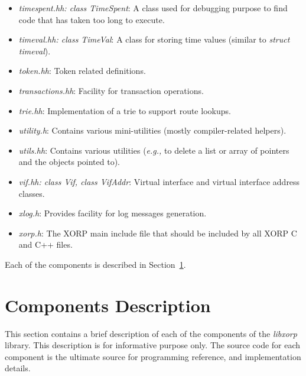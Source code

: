 \documentclass[11pt]{article}
\newcommand{\eg}{\emph{e.g.,}\xspace}
\begin{document}
\begin{itemize}
  \item \emph{timespent.hh: class TimeSpent}: A class used for debugging
  purpose to find code that has taken too long to execute.

  \item \emph{timeval.hh: class TimeVal}: A class for storing time values
  (similar to \emph{struct timeval}).

  \item \emph{token.hh}: Token related definitions.

  \item \emph{transactions.hh}: Facility for transaction operations.

  \item \emph{trie.hh}: Implementation of a trie to support route
  lookups.

  \item \emph{utility.h}: Contains various mini-utilities
  (mostly compiler-related helpers).

  \item \emph{utils.hh}: Contains various utilities (\eg to delete a
  list or array of pointers and the objects pointed to).

  \item \emph{vif.hh: class Vif, class VifAddr}: Virtual interface and
  virtual interface address classes.

  \item \emph{xlog.h}: Provides facility for log messages generation.

  \item \emph{xorp.h}: The XORP main include file that should be included
  by all XORP C and C++ files.

\end{itemize}

Each of the components is described in
Section~\ref{sec:components_description}.


\section{Components Description}
\label{sec:components_description}

This section contains a brief description of each of the components of
the \emph{libxorp} library. This description is for informative
purpose only. The source code for each component is the ultimate source
for programming reference, and implementation details.
\end{document}
